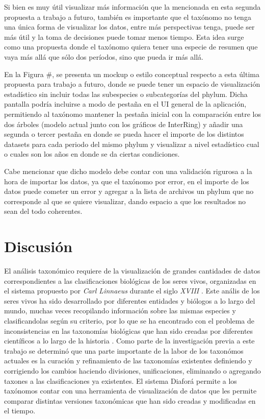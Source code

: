 \documentclass[journal]{IEEEtran}
\begin{document}
Si bien es muy útil visualizar más información que la mencionada en esta segunda propuesta a trabajo a futuro, también es importante que el taxónomo no tenga una única forma de visualizar los datos, entre más perspectivas tenga, puede ser más útil y la toma de decisiones puede tomar menos tiempo. Esta idea surge como una propuesta donde el taxónomo quiera tener una especie de resumen que vaya más allá que sólo dos períodos, sino que pueda ir más allá.

En la Figura #, se presenta un mockup o estilo conceptual respecto a esta última propuesta para trabajo a futuro, donde se puede tener un espacio de visualización estadístico sin incluir todas las subespecies o subcategorías del phylum. Dicha pantalla podría incluirse a modo de pestaña en el UI general de la aplicación, permitiendo al taxónomo mantener la pestaña inicial con la comparación entre los dos árboles (modelo actual junto con los gráficos de InterRing) y añadir una segunda o tercer pestaña en donde se pueda hacer el importe de los distintos datasets para cada periodo del mismo phylum y visualizar a nivel estadístico cual o cuales son los años en donde se da ciertas condiciones.

Cabe mencionar que dicho modelo debe contar con una validación rigurosa a la hora de importar los datos, ya que el taxónomo por error, en el importe de los datos puede cometer un error y agregar a la lista de archivos un phylum que no corresponde al que se quiere visualizar, dando espacio a que los resultados no sean del todo coherentes.


\section {Discusión}
El análisis taxonómico requiere de la visualización de grandes cantidades de datos correspondientes a las clasificaciones biológicas de los seres vivos, organizadas en el sistema 
propuesto por \emph{Carl Linnaeus} durante el siglo \emph{XVIII} \cite{linne}.
Este anális de los seres vivos  ha sido desarrollado por diferentes entidades y biólogos a lo largo del mundo, muchas veces recopilando información sobre las mismas especies
y clasificandolas según su criterio, por lo que se ha encontrado con el problema de inconsistencias en las taxonomías biológicas que han sido creadas por 
diferentes científicos a lo largo de la historia \cite{avise_liu_2011}.
Como parte de la investigación previa a este trabajo se determinó que una parte importante de la labor de los taxonómos actuales es la curación y refinamiento de las taxonomías existentes
definiendo y corrigiendo los cambios haciendo divisiones, unificaciones, eliminando o agregando taxones a las clasificaciones ya existentes.
El sistema Diaforá \cite{sancho_diafora} permite a los taxónomos contar con una herramienta  de visualización de datos que les permite comparar distintas versiones taxonómicas que han sido creadas y modificadas en el tiempo.
\end{document}
